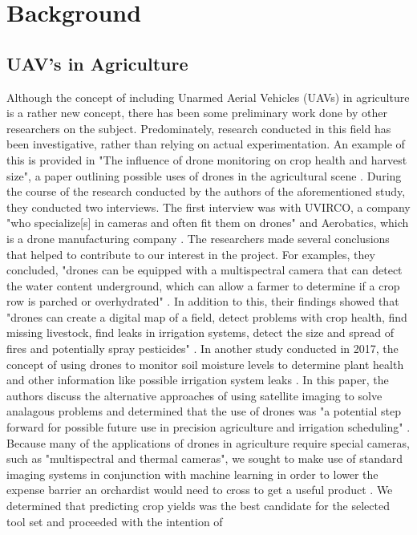 \section{Background}
\subsection{UAV's in Agriculture}
Although the concept of including Unarmed Aerial Vehicles (UAVs) in agriculture is a rather new concept, there has been some preliminary work done by other researchers on the subject.
Predominately, research conducted in this field has been investigative, rather than relying on actual experimentation.
An example of this is provided in "The influence of drone monitoring on crop health and harvest size", a paper outlining possible uses of drones in the agricultural scene \cite{Reinecke2017}.
During the course of the research conducted by the authors of the aforementioned study, they conducted two interviews. 
The first interview was with UVIRCO, a company "who specialize[s] in cameras and often fit them on drones" and Aerobatics, which is a drone manufacturing company \cite{Reinecke2017}.
The researchers made several conclusions that helped to contribute to our interest in the project.
For examples, they concluded, "drones can be equipped with a multispectral camera that can detect the water content underground, which can allow a farmer to determine if a crop row is parched or overhydrated" \cite{Reinecke2017}.
In addition to this, their findings showed that "drones can create a digital map of a field, detect problems with crop health, find missing livestock, find leaks in irrigation systems, detect the size and spread of fires and potentially spray pesticides" \cite{Reinecke2017}.
In another study conducted in 2017, the concept of using drones to monitor soil moisture levels to determine plant health and other information like possible irrigation system leaks \cite{Hassan2017}. In this paper, the authors discuss the alternative approaches of using satellite imaging to solve analagous problems and determined that the use of drones was "a potential step forward for possible future use in precision agriculture and irrigation scheduling" \cite{Hassan2017}.
\\
Because many of the applications of drones in agriculture require special cameras, such as "multispectral and thermal cameras", we sought to make use of standard imaging systems in conjunction with machine learning in order to lower the expense barrier an orchardist would need to cross to get a useful product \cite{Reinecke2017}.
We determined that predicting crop yields was the best candidate for the selected tool set and proceeded with the intention of 